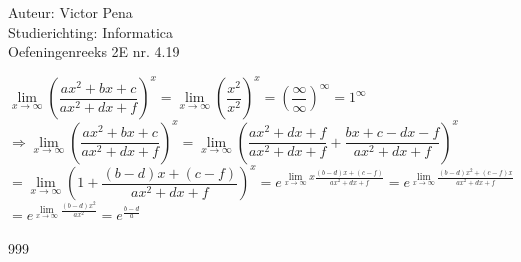 \documentclass[a4paper]{article}
\begin{document}
	
	\noindent \large Auteur: Victor Pena \\
	\noindent \large Studierichting: Informatica\\
	\noindent \large Oefeningenreeks 2E nr. 4.19\\
	
	\medskip
	
	\normalsize 
	
	$\lim\limits_{x\to\infty}$$\left(\dfrac{ax^2+bx+c}{ax^2+dx+f}\right)^x = \lim\limits_{x\to\infty}\left(\dfrac{x^2}{x^2}\right)^x=\left(\dfrac{\infty}{\infty}\right)^\infty = 1^\infty$ \\
	
	$\Rightarrow \lim\limits_{x\to\infty}$$\left(\dfrac{ax^2+bx+c}{ax^2+dx+f}\right)^x = \lim\limits_{x\to\infty}$$\left(\dfrac{ax^2+dx+f}{ax^2+dx+f} + \dfrac{bx+c-dx-f}{ax^2+dx+f} \right)^x$ \\  
	
	$ = \lim\limits_{x\to\infty}\left(1 + \dfrac{(b-d)x + (c-f)}{ax^2+dx+f} \right)^x = e^{\lim\limits_{x\to\infty}x\tfrac{(b-d)x + (c-f)}{ax^2+dx+f}}
	= e^{\lim\limits_{x\to\infty}\tfrac{(b-d)x^2 + (c-f)x}{ax^2+dx+f}}$ \\
	
	$= e^{\lim\limits_{x\to\infty}\tfrac{(b-d)x^2}{ax^2}} = e^{\tfrac{b-d}{a}}$
	
	
	\begin{thebibliography}{999}
	\end{thebibliography}
\end{document}
